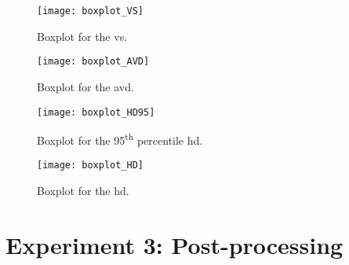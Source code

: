 \begin{figure}[htbp]
	\centering
	\texttt{[image: boxplot\_VS]}
    \caption[Boxplot for the \acrlong{vs} for 3D Context]{Boxplot for the \acrlong{vs}.}
    \label{fig:results_boxplot_vs}
\end{figure}
\begin{figure}[htbp]
	\centering
	\texttt{[image: boxplot\_AVD]}
    \caption[Boxplot for the \acrlong{avd} for 3D Context]{Boxplot for the \acrlong{avd}.}
    \label{fig:results_boxplot_avd}
\end{figure}
\begin{figure}[htbp]	
	\centering
	\texttt{[image: boxplot\_HD95]}
    \caption[Boxplot for the \acrlong{hd95} for 3D Context]{Boxplot for the 95\textsuperscript{th} percentile \acrlong{hd}.}
    \label{fig:results_boxplot_hd95}
\end{figure}
\begin{figure}[htbp]	
	\centering
	\texttt{[image: boxplot\_HD]}
    \caption[Boxplot for the \acrlong{hd} for 3D Context]{Boxplot for the \acrlong{hd}.}
    \label{fig:results_boxplot_hd}
\end{figure}

\section{Experiment 3: Post-processing} %

